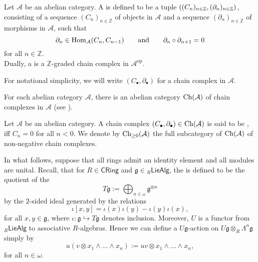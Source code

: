 \begin{definition}
	Let $\mathcal{A}$ be an abelian category. A  is defined to be a tuple $\del[0]{(C_n)_{n \in \mathbb{Z}},(\partial_n)_{n \in \mathbb{Z}}}$, consisting of a sequence $(C_n)_{n \in \mathbb{Z}}$ of objects in $\mathcal{A}$ and a sequence $(\partial_n)_{n \in \mathbb{Z}}$ of morphisms in $\mathcal{A}$, such that 
	\begin{equation*}
		\partial_n \in \operatorname{Hom}_\mathcal{A}(C_n,C_{n - 1}) \qquad \text{and} \qquad \partial_n \circ \partial_{n + 1} = 0
	\end{equation*}
	\noindent for all $n \in \mathbb{Z}$.\\
	Dually, a  is a $\mathbb{Z}$-graded chain complex in $\mathcal{A}^\mathrm{op}$. 
\end{definition}

\begin{remark}
	For notational simplicity, we will write $(C_\bullet,\partial_\bullet)$ for a chain complex in $\mathcal{A}$.
\end{remark}

\begin{remark}
	For each abelian category $\mathcal{A}$, there is an abelian category $\operatorname{Ch}(\mathcal{A})$ of chain complexes in $\mathcal{A}$ (see \cite[7]{weibel:homological_algebra:1994}).
\end{remark}

\begin{definition}
	Let $\mathcal{A}$ be an abelian category. A chain complex $(C_\bullet,\partial_\bullet) \in \operatorname{Ch}(\mathcal{A})$ is said to be , iff $C_n = 0$ for all $n < 0$. We denote by $\operatorname{Ch}_{\geq 0}(\mathcal{A})$ the full subcategory of $\operatorname{Ch}(\mathcal{A})$ of non-negative chain complexes.
\end{definition}

In what follows, suppose that all rings admit an identity element and all modules are unital. Recall, that for $R \in \mathsf{CRing}$ and $\mathfrak{g} \in {_{R}\mathsf{LieAlg}}$, the  is defined to be the quotient of the 
\begin{equation*}
	T\mathfrak{g} := \bigoplus_{n \in \omega} \mathfrak{g}^{\otimes n}
\end{equation*}
\noindent by the $2$-sided ideal generated by the relations
\begin{equation*}
	\iota[x,y] = \iota(x)\iota(y) - \iota(y)\iota(x),
\end{equation*}
\noindent for all $x,y \in \mathfrak{g}$, where $\iota : \mathfrak{g} \hookrightarrow T\mathfrak{g}$ denotes inclusion. Moreover, $U$ is a functor from $_{R}\mathsf{LieAlg}$ to associative $R$-algebras. Hence we can define a $U\mathfrak{g}$-action on $U\mathfrak{g} \otimes_R \Lambda^n \mathfrak{g}$ simply by
\begin{equation*}
	u(v \otimes x_1 \wedge \dots \wedge x_n) := uv \otimes x_1 \wedge \dots \wedge x_n,
\end{equation*}
\noindent for all $n \in \omega$.

